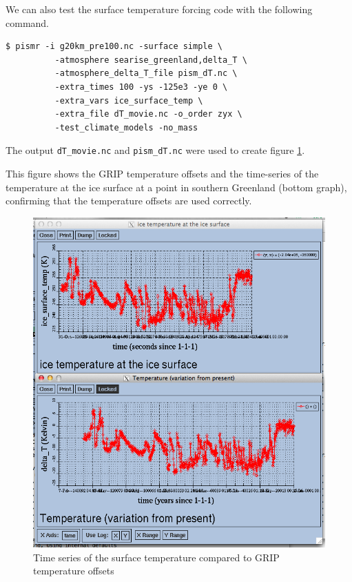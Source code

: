 \documentclass[titlepage,letterpaper,final]{scrartcl}
\begin{document}
\bigskip
We can also test the surface temperature forcing code with the following command.
\begin{verbatim}
$ pismr -i g20km_pre100.nc -surface simple \
          -atmosphere searise_greenland,delta_T \
          -atmosphere_delta_T_file pism_dT.nc \
          -extra_times 100 -ys -125e3 -ye 0 \
          -extra_vars ice_surface_temp \
          -extra_file dT_movie.nc -o_order zyx \
          -test_climate_models -no_mass
\end{verbatim}%
The output \texttt{dT_movie.nc} and \texttt{pism_dT.nc} were used to create figure \ref{fig:artm-timeseries}.

This figure shows the GRIP temperature offsets and the time-series of the temperature at the ice surface at a point in southern Greenland (bottom graph), confirming that the temperature offsets are used correctly.

\begin{figure}[ht]
  \centering
  \includegraphics[width=5in]{dT-movie}
  \caption{Time series of the surface temperature compared to GRIP temperature offsets}
  \label{fig:artm-timeseries}
\end{figure}


\clearpage\newpage
\newcommand{\surface}{Surface components (\texttt{-surface}; default: \texttt{given})}
\end{document}
